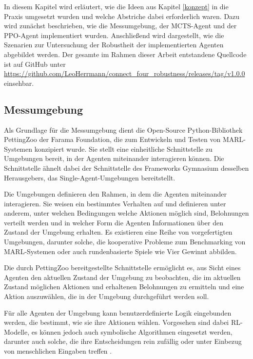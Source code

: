 In diesem Kapitel wird erläutert, wie die Ideen aus Kapitel \ref{konzept} in die Praxis umgesetzt wurden und welche Abstriche dabei erforderlich waren. Dazu wird zunächst beschrieben, wie die Messumgebung, der MCTS-Agent und der PPO-Agent implementiert wurden. Anschließend wird dargestellt, wie die Szenarien zur Untersuchung der Robustheit der implementierten Agenten abgebildet werden. Der gesamte im Rahmen dieser Arbeit entstandene Quellcode ist auf GitHub unter \url{https://github.com/LeoHerrmann/connect_four_robustness/releases/tag/v1.0.0} einsehbar.

\subsection{Messumgebung}

\label{messumgebung}


Als Grundlage für die Messumgebung dient die Open-Source Python-Bibliothek PettingZoo der Farama Foundation, die zum Entwickeln und Testen von MARL-Systemen konzipiert wurde. Sie stellt eine einheitliche Schnittstelle zu Umgebungen bereit, in der Agenten miteinander interagieren können. Die Schnittstelle ähnelt dabei der Schnittstelle des Frameworks Gymnasium desselben Herausgebers, das Single-Agent-Umgebungen bereitstellt.

Die Umgebungen definieren den Rahmen, in dem die Agenten miteinander interagieren. Sie weisen ein bestimmtes Verhalten auf und definieren unter anderem, unter welchen Bedingungen welche Aktionen möglich sind, Belohnungen verteilt werden und in welcher Form die Agenten Informationen über den Zustand der Umgebung erhalten. Es existieren eine Reihe von vorgefertigten Umgebungen, darunter solche, die kooperative Probleme zum Benchmarking von MARL-Systemen oder auch rundenbasierte Spiele wie Vier Gewinnt abbilden.

Die durch PettingZoo bereitgestellte Schnittstelle ermöglicht es, aus Sicht eines Agenten den aktuellen Zustand der Umgebung zu beobachten, die im aktuellen Zustand möglichen Aktionen und erhaltenen Belohnungen zu ermitteln und eine Aktion auszuwählen, die in der Umgebung durchgeführt werden soll.

Für alle Agenten der Umgebung kann benutzerdefinierte Logik eingebunden werden, die bestimmt, wie sie ihre Aktionen wählen. Vorgesehen sind dabei RL-Modelle, es können jedoch auch symbolische Algorithmen eingesetzt werden, darunter auch solche, die ihre Entscheidungen rein zufällig oder unter Einbezug von menschlichen Eingaben treffen \cite{Farama.2025}.

